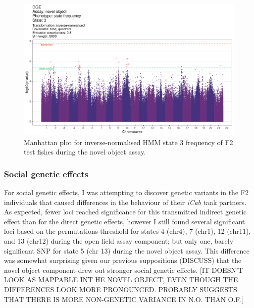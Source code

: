 \documentclass[
]{book}
\begin{document}
\begin{figure}
\includegraphics[width=1\linewidth]{figs/mikk_behaviour/manhattans/dge_no_3_time-quadrant} \caption{Manhattan plot for inverse-normalised HMM state 3 frequency of F2 test fishes during the novel object assay.}\label{fig:F2-man-dge-no-3}
\end{figure}

\hypertarget{social-genetic-effects-2}{%
\subsubsection{Social genetic effects}\label{social-genetic-effects-2}}

For social genetic effects, I was attempting to discover genetic variants in the F2 individuals that caused differences in the behaviour of their \emph{\textcolor{iCab_424B4D}{iCab}} tank partners. As expected, fewer loci reached significance for this transmitted indirect genetic effect than for the direct genetic effects, however I still found several significant loci based on the permutations threshold for states 4 (chr4), 7 (chr1), 12 (chr11), and 13 (chr12) during the open field assay component; but only one, barely significant SNP for state 5 (chr 13) during the novel object assay. This difference was somewhat surprising given our previous suppositions (DISCUSS) that the novel object component drew out stronger social genetic effects. {[}IT DOESN'T LOOK AS MAPPABLE INT HE NOVEL OBJECT, EVEN THOUGH THE DIFFERENCES LOOK MORE PRONOUNCED. PROBABLY SUGGESTS THAT THERE IS MORE NON-GENETIC VARIANCE IN N.O. THAN O.F.{]}
\end{document}
